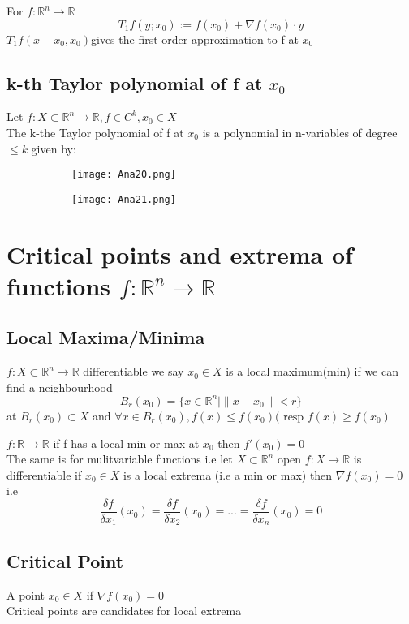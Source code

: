 \documentclass[8pt]{extreport}
\newcommand{\R}{\mathbb{R}}
\begin{document}
For $f:\R^n \to \R$
$$ T_1f(y;x_0):= f(x_0) + \nabla f(x_0)\cdot y$$
$T_1f(x-x_0,x_0) $gives the first order approximation to f at $x_0$

\subsection{k-th Taylor polynomial of f at $x_0$}
Let $f:X\subset \R^n \to \R, f\in C^k, x_0 \in X$\\
The k-the Taylor polynomial of f at $x_0$ is a polynomial in n-variables of degree $\leq k$ given by:
\begin{figure}[H]
\centering
\begin{subfigure}[b]{0.4\linewidth}
\texttt{[image: Ana20.png]}
\end{subfigure}
\begin{subfigure}[b]{0.4\linewidth}
\texttt{[image: Ana21.png]}
\end{subfigure}
\end{figure}

\section{Critical points and extrema of functions $f: \R^n \to \R$}

\subsection{Local Maxima/Minima}

$f: X \subset \R^n \to \R$ differentiable we say $x_0 \in X$ is a local maximum(min) if we can find a neighbourhood 
$$B_r(x_0) = \{x \in \R^n \mid \|x-x_0\| < r \}$$
at $B_r(x_0) \subset X$ and $\forall x \in B_r(x_0), f(x) \leq f(x_0)(\text{ resp } f(x) \geq f(x_0)$

$f: \R \to \R$ if f has a local min or max at $x_0$ then $f'(x_0) = 0$\\
The same is for mulitvariable functions i.e
let $X \subset \R^n$ open $f:X \to \R$ is differentiable if $x_0 \in X$ is a local extrema (i.e a min or max) then $\nabla f(x_0) = 0$ i.e
$$ \frac{\delta f}{\delta x_1}(x_0) = \frac{\delta f}{\delta x_2}(x_0) = ... = \frac{\delta f}{\delta x_n} (x_0) = 0$$

\subsection{Critical Point}
A point $x_0 \in X$ if $\nabla f(x_0) = 0$\\
Critical points are candidates for local extrema
\end{document}
